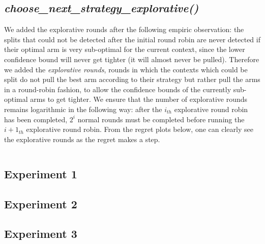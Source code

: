 \documentclass[11pt]{article} %
\begin{document}
\begin{samepage}
\subsection{\textit{choose\_next\_strategy\_explorative()}}
We added the explorative rounds after the following empiric observation: the splits that could not be detected after the initial round robin are never detected if their optimal arm is very sub-optimal for the current context, since the lower confidence bound will never get tighter (it will almost never be pulled). Therefore we added the \textit{explorative rounds}, rounds in which the contexts which could be split do not pull the best arm according to their strategy but rather pull the arms in a round-robin fashion, to allow the confidence bounds of the currently sub-optimal arms to get tighter. We ensure that the number of explorative rounds remains logarithmic in the following way: after the $i_{th}$ explorative round robin has been completed, $2^i$ normal rounds must be completed before running the $i+1_{th}$ explorative round robin. From the regret plots below, one can clearly see the explorative rounds as the regret makes a step.

\inputminted{python}{code/step4_choose_next_strategy_explorative.py}
\end{samepage}

\clearpage
\subsection{Experiment 1}

\clearpage

{\footnotesize}

\clearpage
\subsection{Experiment 2}

\clearpage

{\footnotesize}

\clearpage
\subsection{Experiment 3}
\end{document}
